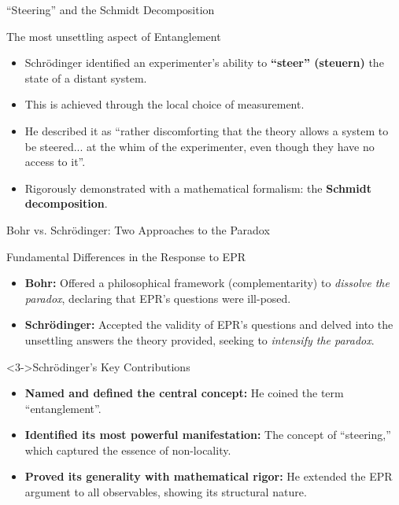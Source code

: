 \begin{frame}{``Steering'' and the Schmidt Decomposition}

  \begin{block}{The most unsettling aspect of Entanglement}
    \begin{itemize}[<+->]
      \item Schrödinger identified an experimenter's ability to \textbf{``steer'' (steuern)} the state of a distant system.
      \item This is achieved through the local choice of measurement.
      \item He described it as ``rather discomforting that the theory allows a system to be steered... at the whim of the experimenter, even though they have no access to it''.
      \item Rigorously demonstrated with a mathematical formalism: the \textbf{Schmidt decomposition}.
    \end{itemize}
  \end{block}

\end{frame}

\begin{frame}{Bohr vs. Schrödinger: Two Approaches to the Paradox}

  \begin{block}{Fundamental Differences in the Response to EPR}
    \begin{itemize}[<+->]
      \item \textbf{Bohr:} Offered a philosophical framework (complementarity) to \emph{dissolve the paradox}, declaring that EPR's questions were ill-posed.
      \item \textbf{Schrödinger:} Accepted the validity of EPR's questions and delved into the unsettling answers the theory provided, seeking to \emph{intensify the paradox}.
    \end{itemize}
  \end{block}

  \begin{alertblock}<3->{Schrödinger's Key Contributions}
    \begin{itemize}[<+->]
      \item \textbf{Named and defined the central concept:} He coined the term ``entanglement''.
      \item \textbf{Identified its most powerful manifestation:} The concept of ``steering,'' which captured the essence of non-locality.
      \item \textbf{Proved its generality with mathematical rigor:} He extended the EPR argument to all observables, showing its structural nature.
    \end{itemize}
  \end{alertblock}

\end{frame}
